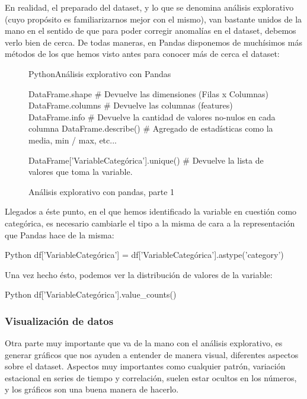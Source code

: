 En realidad, el preparado del dataset, y lo que se denomina análisis explorativo
(cuyo propósito es familiarizarnos mejor con el mismo), van bastante unidos de la mano en
el sentido de que para poder corregir anomalías en el dataset, debemos verlo
bien de cerca. De todas maneras, en Pandas disponemos de muchísimos más métodos
de los que hemos visto antes para conocer más de cerca el dataset:


\begin{figure}[ht]
  \centering
  \begin{TMcode}{Python}{}{Análisis explorativo con Pandas}

    DataFrame.shape   # Devuelve las dimensiones (Filas x Columnas)
    DataFrame.columns # Devuelve las columnas (features)
    DataFrame.info    # Devuelve la cantidad de valores no-nulos en cada columna
    DataFrame.describe() # Agregado de estadísticas como la media, min / max, etc...

    DataFrame['VariableCategórica'].unique() # Devuelve la lista de valores que toma la variable.
  \end{TMcode}
  \caption{\label{fig:pandasExplorative} Análisis explorativo con pandas, parte 1}
\end{figure}

Llegados a éste punto, en el que hemos identificado la variable en cuestión como
categórica, es necesario cambiarle el tipo a la misma de cara a la
representación que Pandas hace de la misma:


\vspace{0.5cm}
\begin{TMcode}{Python}{}{}
  df['VariableCategórica'] = df['VariableCategórica'].astype('category')
\end{TMcode}

\vspace{0.5cm}

Una vez hecho ésto, podemos ver la distribución de valores de la variable:

\vspace{0.5cm}
\begin{TMcode}{Python}{}{}
  df['VariableCategórica'].value_counts()
\end{TMcode}


\subsubsection{Visualización de datos}
\label{subsec:state_dataScience_dataVisualization}

Otra parte muy importante que va de la mano con el análisis explorativo, es
generar gráficos que nos ayuden a entender de manera visual, diferentes aspectos
sobre el dataset. Aspectos muy importantes como cualquier patrón, variación
estacional en series de tiempo y correlación, suelen estar ocultos en los
números, y los gráficos son una buena manera de hacerlo. 

